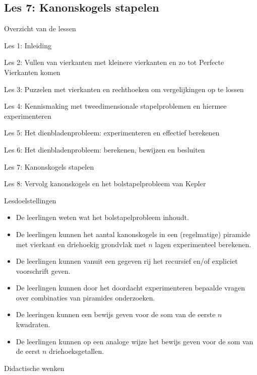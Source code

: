\documentclass[dutch]{beamer}
\begin{document}
\subsection{Les 7: Kanonskogels stapelen}
\begin{frame}
{Overzicht van de lessen}
\begin{list}{\quad}{}
\item Les 1: Inleiding
\item Les 2: Vullen van vierkanten met kleinere vierkanten en zo tot Perfecte Vierkanten komen
\item Les 3: Puzzelen met vierkanten en rechthoeken om vergelijkingen op te lossen
\item Les 4: Kennismaking met tweedimensionale stapelproblemen en hiermee experimenteren
\item Les 5: Het dienbladenprobleem: experimenteren en effectief berekenen
\item Les 6: Het dienbladenprobleem: berekenen, bewijzen en besluiten
\item {\color{blue}Les 7: Kanonskogels stapelen}
\item Les 8: Vervolg kanonskogels en het bolstapelprobleem van Kepler
\end{list}
\end{frame}

\begin{frame}{Lesdoelstellingen}
\begin{itemize}
\item De leerlingen weten wat het bolstapelprobleem inhoudt.
\item De leerlingen kunnen het aantal kanonskogels in een (regelmatige) piramide met vierkant en driehoekig grondvlak met $n$ lagen experimenteel berekenen.
\item De leerlingen kunnen vanuit een gegeven rij het recursief en/of expliciet voorschrift geven.
\item De leerlingen kunnen door het doordacht experimenteren bepaalde vragen over combinaties van piramides onderzoeken.
\item De leeringen kunnen een bewijs geven voor de som van de eerste $n$ kwadraten.
\item De leerlingen kunnen op een analoge wijze het bewijs geven voor de som van de eerst $n$ driehoeksgetallen.
\end{itemize}
\end{frame}

\begin{frame}{Didactische wenken}
\end{frame}
\end{document}

